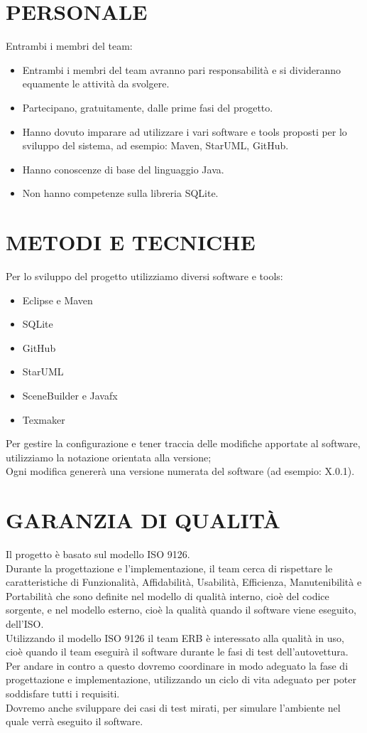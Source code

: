 \documentclass{report}
\begin{document}
\begingroup
\let\clearpage\relax
\chapter{PERSONALE}
\endgroup
Entrambi i membri del team:
\begin{itemize}
\item Entrambi i membri del team avranno pari responsabilità e si divideranno equamente le attività da svolgere.
\item Partecipano, gratuitamente, dalle prime fasi del progetto.
\item Hanno dovuto imparare ad utilizzare i vari software e tools proposti per lo sviluppo del sistema, ad esempio:
 Maven, StarUML, GitHub.
\item Hanno conoscenze di base del linguaggio Java.
\item Non hanno competenze sulla libreria SQLite.
\end{itemize}

\chapter{METODI E TECNICHE}
Per lo sviluppo del progetto utilizziamo diversi software e tools:
\begin{itemize}
\item Eclipse e Maven
\item SQLite
\item GitHub
\item StarUML
\item SceneBuilder e Javafx
\item Texmaker
\end{itemize}
Per gestire la configurazione e tener traccia delle modifiche apportate al software, utilizziamo la notazione orientata alla versione;\\
Ogni modifica genererà una versione numerata del software (ad esempio: X.0.1).

\chapter{GARANZIA DI QUALITÀ}
Il progetto è basato sul modello ISO 9126.\\
Durante la progettazione e l'implementazione, il team cerca di rispettare le caratteristiche di Funzionalità, Affidabilità, Usabilità, Efficienza, Manutenibilità e Portabilità che sono definite nel modello di qualità interno, cioè del codice sorgente, e nel modello esterno, cioè la qualità quando il software viene eseguito, dell'ISO.\\
Utilizzando il modello ISO 9126 il team ERB è interessato alla qualità in uso, cioè quando il team eseguirà il software durante le fasi di test dell'autovettura.\\
Per andare in contro a questo dovremo coordinare in modo adeguato la fase di progettazione e implementazione, utilizzando un ciclo di vita adeguato per poter soddisfare tutti i requisiti.\\
Dovremo anche sviluppare dei casi di test mirati, per simulare l'ambiente nel quale verrà eseguito il software.
\end{document}
